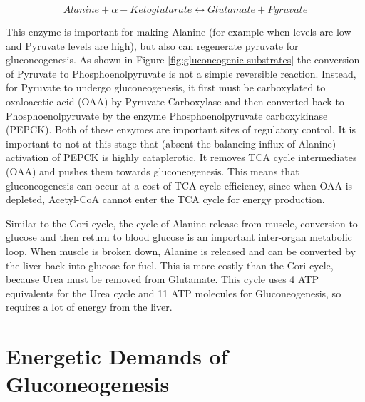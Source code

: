 \documentclass{tufte-handout}
\begin{document}
\begin{equation}\label{eq:alt}
Alanine + \alpha - Ketoglutarate \leftrightarrow Glutamate + Pyruvate
\end{equation}

This enzyme is important for making Alanine (for example when levels are low and Pyruvate levels are high), but also can regenerate pyruvate for gluconeogenesis.  As shown in Figure \ref{fig:gluconeogenic-substrates} the conversion of Pyruvate to Phosphoenolpyruvate is not a simple reversible reaction.  Instead, for Pyruvate to undergo gluconeogenesis, it first must be carboxylated to oxaloacetic acid (OAA) by Pyruvate Carboxylase and then converted back to Phosphoenolpyruvate by the enzyme Phosphoenolpyruvate carboxykinase (PEPCK).  Both of these enzymes are important sites of regulatory control. It is important to not at this stage that (absent the balancing influx of Alanine) activation of PEPCK is highly cataplerotic.  It removes TCA cycle intermediates (OAA) and pushes them towards gluconeogenesis.  This means that gluconeogenesis can occur at a cost of TCA cycle efficiency, since when OAA is depleted, Acetyl-CoA cannot enter the TCA cycle for energy production.

  Similar to the Cori cycle, the cycle of Alanine release from muscle, conversion to glucose and then return to blood glucose is an important inter-organ metabolic loop.  When muscle is broken down, Alanine is released and can be converted by the liver back into glucose for fuel.  This is more costly than the Cori cycle, because Urea must be removed from Glutamate.  This cycle uses 4 ATP equivalents for the Urea cycle and 11 ATP molecules for Gluconeogenesis, so requires a lot of energy from the liver.

\section{Energetic Demands of Gluconeogenesis}
\end{document}
